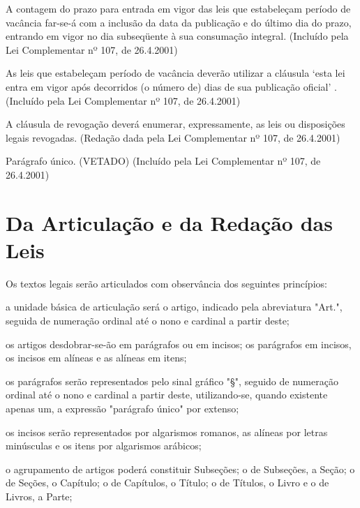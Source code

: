 \documentclass[a5paper,capitulo,titlepage=false]{br-lex}
\begin{document}
\paragrafo A contagem do prazo para entrada em vigor das leis que estabeleçam período de vacância far-se-á com a inclusão da data da publicação e do último dia do prazo, entrando em vigor no dia subseqüente à sua consumação integral.    (Incluído pela Lei Complementar nº 107, de 26.4.2001)

\paragrafo As leis que estabeleçam período de vacância deverão utilizar a cláusula ‘esta lei entra em vigor após decorridos (o número de) dias de sua publicação oficial’ .    (Incluído pela Lei Complementar nº 107, de 26.4.2001)




\artigo A cláusula de revogação deverá enumerar, expressamente, as leis ou disposições legais revogadas.    (Redação dada pela Lei Complementar nº 107, de 26.4.2001)

Parágrafo único. (VETADO)     (Incluído pela Lei Complementar nº 107, de 26.4.2001)

\clearpage 
\section[Da Articulação e da Redação das Leis]{Da Articulação e da Redação das Leis}

\artigo Os textos legais serão articulados com observância dos seguintes princípios:


\inciso a unidade básica de articulação será o artigo, indicado pela abreviatura "Art.", seguida de numeração ordinal até o nono e cardinal a partir deste;

\inciso os artigos desdobrar-se-ão em parágrafos ou em incisos; os parágrafos em incisos, os incisos em alíneas e as alíneas em itens;

\inciso os parágrafos serão representados pelo sinal gráfico "§", seguido de numeração ordinal até o nono e cardinal a partir deste, utilizando-se, quando existente apenas um, a expressão "parágrafo único" por extenso;

\inciso os incisos serão representados por algarismos romanos, as alíneas por letras minúsculas e os itens por algarismos arábicos;

\inciso o agrupamento de artigos poderá constituir Subseções; o de Subseções, a Seção; o de Seções, o Capítulo; o de Capítulos, o Título; o de Títulos, o Livro e o de Livros, a Parte;
\end{document}
